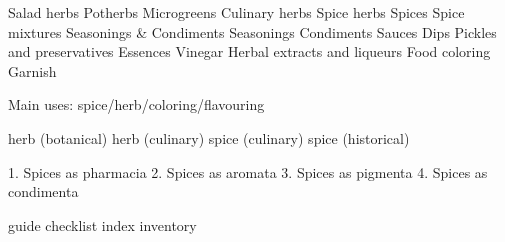 Salad herbs
    Potherbs
    Microgreens
Culinary herbs
Spice herbs
Spices
Spice mixtures
Seasonings \& Condiments
    Seasonings
    Condiments
    Sauces
    Dips
    Pickles and preservatives
    Essences
    Vinegar
    Herbal extracts and liqueurs
    Food coloring
    Garnish

Main uses: spice/herb/coloring/flavouring

herb (botanical)
herb (culinary)
spice (culinary)
spice (historical)

1. Spices as pharmacia
2. Spices as aromata
3. Spices as pigmenta
4. Spices as condimenta
\parencite{halikowski_smith_portugal_2001}

guide
checklist
index
inventory












\setlength{\tabcolsep}{3pt}


